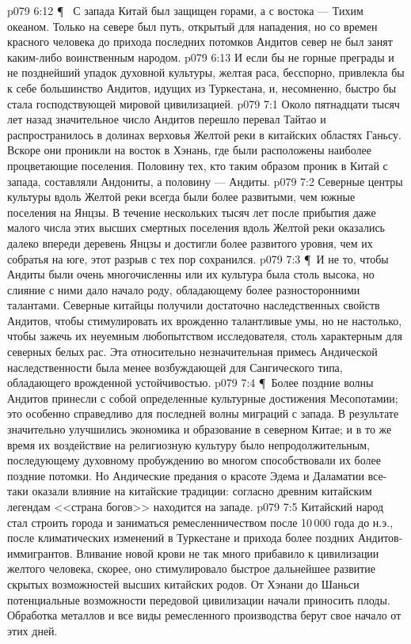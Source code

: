 \vs p079 6:12 \P\ \bibnobreakspace {} С запада Китай был защищен горами, а с востока --- Тихим океаном. Только на севере был путь, открытый для нападения, но со времен красного человека до прихода последних потомков Андитов север не был занят каким\hyp{}либо воинственным народом.
\vs p079 6:13 И если бы не горные преграды и не позднейший упадок духовной культуры, желтая раса, бесспорно, привлекла бы к себе большинство Андитов, идущих из Туркестана, и, несомненно, быстро бы стала господствующей мировой цивилизацией.
\vs p079 7:1 Около пятнадцати тысяч лет назад значительное число Андитов перешло перевал Тайтао и распространилось в долинах верховья Желтой реки в китайских областях Ганьсу. Вскоре они проникли на восток в Хэнань, где были расположены наиболее процветающие поселения. Половину тех, кто таким образом проник в Китай с запада, составляли Андониты, а половину --- Андиты.
\vs p079 7:2 Северные центры культуры вдоль Желтой реки всегда были более развитыми, чем южные поселения на Янцзы. В течение нескольких тысяч лет после прибытия даже малого числа этих высших смертных поселения вдоль Желтой реки оказались далеко впереди деревень Янцзы и достигли более развитого уровня, чем их собратья на юге, этот разрыв с тех пор сохранился.
\vs p079 7:3 \P\ И не то, чтобы Андиты были очень многочисленны или их культура была столь высока, но слияние с ними дало начало роду, обладающему более разносторонними талантами. Северные китайцы получили достаточно наследственных свойств Андитов, чтобы стимулировать их врожденно талантливые умы, но не настолько, чтобы зажечь их неуемным любопытством исследователя, столь характерным для северных белых рас. Эта относительно незначительная примесь Андической наследственности была менее возбуждающей для Сангического типа, обладающего врожденной устойчивостью.
\vs p079 7:4 \P\ Более поздние волны Андитов принесли с собой определенные культурные достижения Месопотамии; это особенно справедливо для последней волны миграций с запада. В результате значительно улучшились экономика и образование в северном Китае; и в то же время их воздействие на религиозную культуру было непродолжительным, последующему духовному пробуждению во многом способствовали их более поздние потомки. Но Андические предания о красоте Эдема и Даламатии все\hyp{}таки оказали влияние на китайские традиции: согласно древним китайским легендам <<страна богов>> находится на западе.
\vs p079 7:5 Китайский народ стал строить города и заниматься ремесленничеством после 10\,000 года до н.э., после климатических изменений в Туркестане и прихода более поздних Андитов\hyp{}иммигрантов. Вливание новой крови не так много прибавило к цивилизации желтого человека, скорее, оно стимулировало быстрое дальнейшее развитие скрытых возможностей высших китайских родов. От Хэнани до Шаньси потенциальные возможности передовой цивилизации начали приносить плоды. Обработка металлов и все виды ремесленного производства берут свое начало от этих дней.
